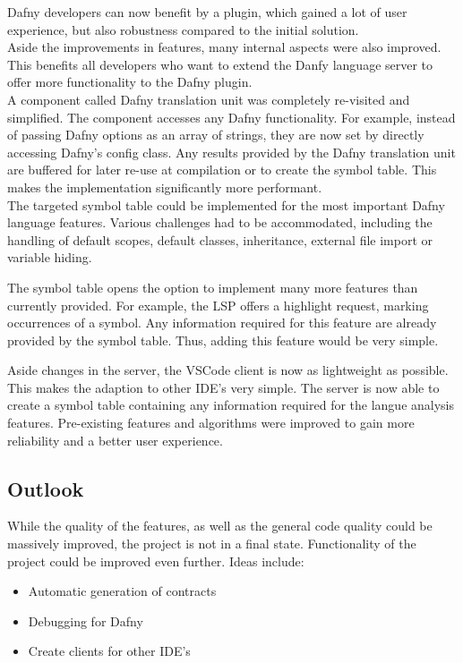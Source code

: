 Dafny developers can now benefit by a plugin, which gained a lot of user experience, but also robustness compared to the initial solution.\\

Aside the improvements in features, many internal aspects were also improved.
This benefits all developers who want to extend the Danfy language server to offer more functionality to the Dafny plugin. \\

A component called Dafny translation unit was completely re-visited and simplified.
The component accesses any Dafny functionality.
For example, instead of passing Dafny options as an array of strings, they are now set by
directly accessing Dafny's config class.
Any results provided by the Dafny translation unit are buffered for later re-use at compilation or to create the symbol table.
This makes the implementation significantly more performant.\\

The targeted symbol table could be implemented for the most important Dafny language features.
Various challenges had to be accommodated, including the handling of default scopes, default classes, inheritance, external file import or variable hiding.

The symbol table opens the option to implement many more features than currently provided.
For example, the LSP offers a highlight request, marking occurrences of a symbol.
Any information required for this feature are already provided by the symbol table.
Thus, adding this feature would be very simple.

Aside changes in the server, the VSCode client is now as lightweight as possible.
This makes the adaption to other IDE's very simple.
The server is now able to create a symbol table containing any information required for the langue analysis features.
Pre-existing features and algorithms were improved to gain more reliability and a better user experience.

\subsection{Outlook}
While the quality of the features, as well as the general code quality could be massively improved, the project is not in a final state.
Functionality of the project could be improved even further.
Ideas include:
\begin{itemize}
    \item Automatic generation of contracts
    \item Debugging for Dafny
    \item Create clients for other IDE's
\end{itemize}

